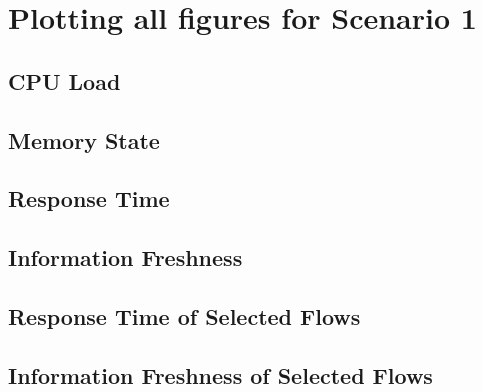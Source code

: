 \documentclass{elsart}
\begin{document}
\section{Plotting all figures for Scenario 1}
\subsection{CPU Load}
\clearpage
\subsection{Memory State}
\clearpage
\subsection{Response Time}
\clearpage
\subsection{Information Freshness}
\clearpage
\subsection{Response Time of Selected Flows}
\clearpage
\subsection{Information Freshness of Selected Flows}
\clearpage
\end{document}
